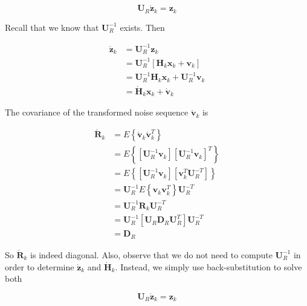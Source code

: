 \begin{equation*}
    \mathbf{U}_R \mathbf{\acute{z}}_k = \mathbf{z}_k
\end{equation*}

Recall that we know that $\mathbf{U}_R^{-1}$ exists. Then

\begin{equation*}
    \begin{aligned}
    \mathbf{\acute{z}}_k &= \mathbf{U}_R^{-1} \mathbf{z}_k \\
    &= \mathbf{U}_R^{-1} \left[ \mathbf{H}_k \mathbf{x}_k + \mathbf{v}_k \right] \\
    &= \mathbf{U}_R^{-1} \mathbf{H}_k \mathbf{x}_k + \mathbf{U}_R^{-1} \mathbf{v}_k \\
    &= \mathbf{\acute{H}}_k \mathbf{x}_k + \mathbf{\acute{v}}_k
    \end{aligned}
\end{equation*}

The covariance of the transformed noise sequence $\mathbf{\acute{v}}_k$ is

\begin{equation*}
    \begin{aligned}
    \mathbf{\acute{R}}_k &= E \left\{ \mathbf{\acute{v}}_k \mathbf{\acute{v}}_k^T \right\} \\
    &= E \left\{ \left[ \mathbf{U}_R^{-1} \mathbf{v}_k \right] \left[ \mathbf{U}_R^{-1} \mathbf{v}_k \right]^T \right\} \\
    &= E \left\{ \left[ \mathbf{U}_R^{-1} \mathbf{v}_k \right] \left[ \mathbf{v}_k^T \mathbf{U}_R^{-T} \right] \right\} \\
    &= \mathbf{U}_R^{-1} E \left\{ \mathbf{v}_k \mathbf{v}_k^T \right\} \mathbf{U}_R^{-T} \\
    &= \mathbf{U}_R^{-1} \mathbf{R}_k \mathbf{U}_R^{-T} \\
    &= \mathbf{U}_R^{-1} \left[ \mathbf{U}_R \mathbf{D}_R \mathbf{U}_R^T \right] \mathbf{U}_R^{-T} \\
    &= \mathbf{D}_R
    \end{aligned}
\end{equation*}

So $\mathbf{\acute{R}}_k$ is indeed diagonal. Also, observe that we do not need to
compute $\mathbf{U}_R^{-1}$ in order to determine $\mathbf{\acute{z}}_k$ and
$\mathbf{\acute{H}}_k$. Instead, we simply use back-substitution to solve both

\begin{equation*}
    \mathbf{U}_R \mathbf{\acute{z}}_k = \mathbf{z}_k
\end{equation*}


